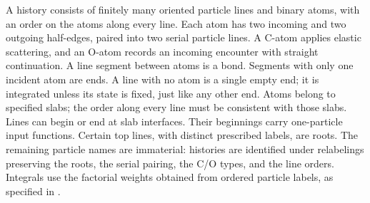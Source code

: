 \begin{definition}\label{def:dhm-history}
A history consists of finitely many oriented particle lines and binary
atoms, with an order on the atoms along every line. Each atom has two
incoming and two outgoing half-edges, paired into two serial particle
lines. A C-atom applies elastic scattering, and an O-atom records an
incoming encounter with straight continuation. A line segment between
atoms is a bond. Segments with only one incident atom are ends. A line
with no atom is a single empty end; it is integrated unless its state
is fixed, just like any other end. Atoms belong to specified slabs; the order
along every line must be consistent with those slabs. Lines can begin
or end at slab interfaces. Their beginnings carry one-particle input
functions. Certain top lines, with distinct prescribed labels, are
roots. The remaining particle names are immaterial: histories are
identified under relabelings preserving the roots, the serial pairing,
the C/O types, and the line orders. Integrals use the factorial weights
obtained from ordered particle labels, as specified in
.


\end{definition}
